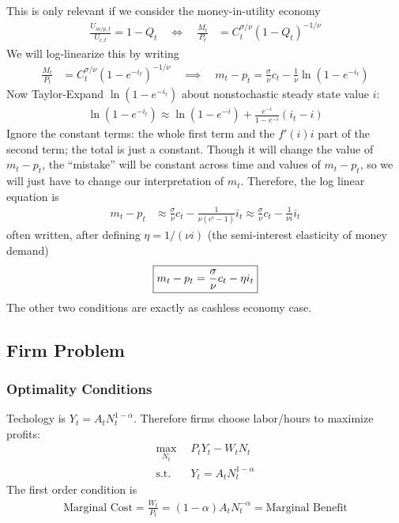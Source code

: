 \documentclass[12pt]{article}
\theoremstyle{plain}
\theoremstyle{definition}
\theoremstyle{remark}
\begin{document}
This is only relevant if we consider the money-in-utility economy
\begin{align*}
  \frac{U_{m/p,t}}{U_{c,t}}
  =
  1 - Q_t
  \quad\iff\quad
  \frac{M_t}{P_t}
  &=
  C_t^{\sigma/\nu}(1 - Q_t)^{-1/\nu}
\end{align*}
We will log-linearize this by writing
\begin{align*}
  \frac{M_t}{P_t}
  &=
  C_t^{\sigma/\nu}(1 - e^{-i_t})^{-1/\nu}
  \quad\implies\quad
  m_t - p_t
  =
  \frac{\sigma}{\nu}c_t
  -\frac{1}{\nu}\ln (1 - e^{-i_t})
\end{align*}
Now Taylor-Expand $\ln(1-e^{-i_t})$ about nonstochastic steady state
value $i$:
\begin{align*}
  \ln(1-e^{-i_t})\approx
  \ln(1-e^{-i})
  + \frac{e^{-i}}{1-e^{-i}}
  (i_t-i)
\end{align*}
Ignore the constant terms: the whole first term and the $f'(i)i$
part of the second term; the total is just a constant. Though it
will change the value of $m_t-p_t$, the ``mistake'' will be constant
across time and values of $m_t-p_t$, so we will just have to change
our interpretation of $m_t$. Therefore, the log linear equation is
\begin{align*}
  m_t - p_t
  &\approx
  \frac{\sigma}{\nu}c_t
  - \frac{1}{\nu(e^{i}-1)}
  i_t
  \approx
  \frac{\sigma}{\nu}c_t
  - \frac{1}{\nu i} i_t
\end{align*}
often written, after defining $\eta=1/(\nu i)$ (the semi-interest
elasticity of money demand)
\begin{align*}
\boxed{%
  m_t - p_t
  =
  \frac{\sigma}{\nu}c_t
  - \eta i_t
}
\end{align*}
The other two conditions are exactly as cashless economy case.


\clearpage
\subsection{Firm Problem}

\subsubsection{Optimality Conditions}

Techology is $Y_t=A_tN_t^{1-\alpha}$. Therefore firms choose labor/hours
to maximize profits:
\begin{align*}
  \max_{N_t} \; &P_tY_t - W_tN_t \\
  \text{s.t.} \quad &Y_t =A_tN_t^{1-\alpha}
\end{align*}
The first order condition is
\begin{align*}
  \text{Marginal Cost} =
  \frac{W_t}{P_t} = (1-\alpha) A_t N_t^{-\alpha}
  = \text{Marginal Benefit}
\end{align*}
\end{document}
